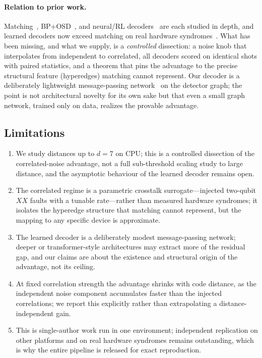 \documentclass[aps,prxquantum,twocolumn,superscriptaddress,nofootinbib,longbibliography]{revtex4-2}
\begin{document}
\paragraph{Relation to prior work.}
Matching~\cite{dennis2002topological,fowler2012surface,higgott2022pymatching},
BP+OSD~\cite{panteleev2021degenerate,roffe2020decoding}, and neural/RL
decoders~\cite{torlai2017neural,varsamopoulos2017decoding,baireuther2018machine,sweke2020reinforcement}
are each studied in depth, and learned decoders now exceed matching on real
hardware syndromes~\cite{bausch2024learning}. What has been missing, and what we
supply, is a \emph{controlled} dissection: a noise knob that interpolates from
independent to correlated, all decoders scored on identical shots with paired
statistics, and a theorem that pins the advantage to the precise structural
feature (hyperedges) matching cannot represent. Our decoder is a deliberately
lightweight message-passing network~\cite{kipf2017semi,gilmer2017neural,velickovic2018graph,hamilton2017inductive}
on the detector graph; the point is not architectural novelty for its own sake but
that even a small graph network, trained only on data, realizes the provable
advantage.

\subsection{Limitations}
\label{sec:limitations}
\begin{enumerate}[leftmargin=1.5em]
  \item We study distances up to $d=7$ on CPU; this is a controlled dissection of
  the correlated-noise advantage, not a full sub-threshold scaling study to large
  distance, and the asymptotic behaviour of the learned decoder remains open.
  \item The correlated regime is a parametric crosstalk surrogate---injected
  two-qubit $XX$ faults with a tunable rate---rather than measured hardware
  syndromes; it isolates the hyperedge structure that matching cannot represent,
  but the mapping to any specific device is approximate.
  \item The learned decoder is a deliberately modest message-passing network;
  deeper or transformer-style architectures may extract more of the residual gap,
  and our claims are about the existence and structural origin of the advantage,
  not its ceiling.
  \item At fixed correlation strength the advantage shrinks with code distance, as
  the independent noise component accumulates faster than the injected
  correlations; we report this explicitly rather than extrapolating a
  distance-independent gain.
  \item This is single-author work run in one environment; independent replication
  on other platforms and on real hardware syndromes remains outstanding, which is
  why the entire pipeline is released for exact reproduction.
\end{enumerate}
\end{document}

